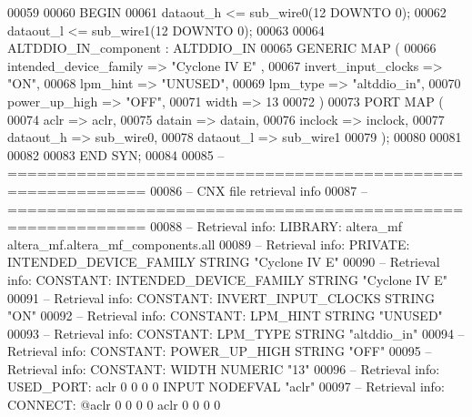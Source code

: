 \begin{DoxyCode}
{00059 
00060 \textcolor{vhdlkeyword}{BEGIN}
00061     \textcolor{vhdlchar}{dataout_h}    \textcolor{vhdlchar}{<=} \textcolor{vhdlchar}{sub_wire0}\textcolor{vhdlchar}{(}\textcolor{vhdllogic}{}\textcolor{vhdllogic}{12} \textcolor{keywordflow}{DOWNTO} \textcolor{vhdllogic}{}\textcolor{vhdllogic}{0}\textcolor{vhdlchar}{)};
00062     \textcolor{vhdlchar}{dataout_l}    \textcolor{vhdlchar}{<=} \textcolor{vhdlchar}{sub_wire1}\textcolor{vhdlchar}{(}\textcolor{vhdllogic}{}\textcolor{vhdllogic}{12} \textcolor{keywordflow}{DOWNTO} \textcolor{vhdllogic}{}\textcolor{vhdllogic}{0}\textcolor{vhdlchar}{)};
00063 
00064     ALTDDIO\_IN\_component : ALTDDIO\_IN
00065     \textcolor{keywordflow}{GENERIC} \textcolor{keywordflow}{MAP} (
00066         intended\_device\_family => \textcolor{keyword}{"Cyclone IV E"}  ,
00067         invert\_input\_clocks => \textcolor{keyword}{"ON"},
00068         lpm\_hint => \textcolor{keyword}{"UNUSED"},
00069         lpm\_type => \textcolor{keyword}{"altddio\_in"},
00070         power\_up\_high => \textcolor{keyword}{"OFF"},
00071         width => \textcolor{vhdllogic}{13}
00072     \textcolor{vhdlchar}{)}
00073     \textcolor{keywordflow}{PORT} \textcolor{keywordflow}{MAP} (
00074         aclr => aclr,
00075         datain => datain,
00076         inclock => inclock,
00077         dataout\_h => sub_wire0,
00078         dataout\_l => sub_wire1
00079     \textcolor{vhdlchar}{)};
00080 
00081 
00082 
00083 \textcolor{keywordflow}{END} \textcolor{vhdlchar}{SYN};
00084 
00085 \textcolor{keyword}{-- ============================================================}
00086 \textcolor{keyword}{-- CNX file retrieval info}
00087 \textcolor{keyword}{-- ============================================================}
00088 \textcolor{keyword}{-- Retrieval info: LIBRARY: altera\_mf altera\_mf.altera\_mf\_components.all}
00089 \textcolor{keyword}{-- Retrieval info: PRIVATE: INTENDED\_DEVICE\_FAMILY STRING "Cyclone IV E"}
00090 \textcolor{keyword}{-- Retrieval info: CONSTANT: INTENDED\_DEVICE\_FAMILY STRING "Cyclone IV E"}
00091 \textcolor{keyword}{-- Retrieval info: CONSTANT: INVERT\_INPUT\_CLOCKS STRING "ON"}
00092 \textcolor{keyword}{-- Retrieval info: CONSTANT: LPM\_HINT STRING "UNUSED"}
00093 \textcolor{keyword}{-- Retrieval info: CONSTANT: LPM\_TYPE STRING "altddio\_in"}
00094 \textcolor{keyword}{-- Retrieval info: CONSTANT: POWER\_UP\_HIGH STRING "OFF"}
00095 \textcolor{keyword}{-- Retrieval info: CONSTANT: WIDTH NUMERIC "13"}
00096 \textcolor{keyword}{-- Retrieval info: USED\_PORT: aclr 0 0 0 0 INPUT NODEFVAL "aclr"}
00097 \textcolor{keyword}{-- Retrieval info: CONNECT: @aclr 0 0 0 0 aclr 0 0 0 0}
}
\end{DoxyCode}
